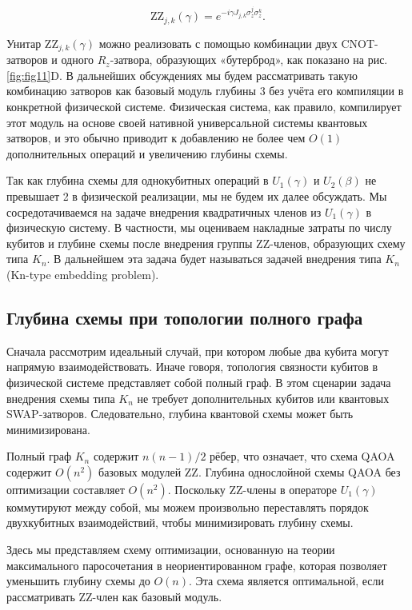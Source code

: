 \begin{equation}
\mathrm{ZZ}_{j,k}(\gamma) = e^{-i \gamma J_{j,k} \sigma_z^j \sigma_z^k}.
\end{equation}

Унитар $\text{ZZ}_{j,k}(\gamma)$ можно реализовать с помощью комбинации двух
CNOT-затворов и одного $R_z$-затвора, образующих «бутерброд», как показано на
рис. \ref{fig:fig11}D. В дальнейших обсуждениях мы будем рассматривать такую
комбинацию затворов как базовый модуль глубины 3 без учёта его компиляции в
конкретной физической системе. Физическая система, как правило, компилирует
этот модуль на основе своей нативной универсальной системы квантовых затворов,
и это обычно приводит к добавлению не более чем $O(1)$ дополнительных операций
и увеличению глубины схемы.

Так как глубина схемы для однокубитных операций в $U_1(\gamma)$ и $U_2(\beta)$
не превышает 2 в физической реализации, мы не будем их далее обсуждать. Мы
сосредотачиваемся на задаче внедрения квадратичных членов из $U_1(\gamma)$ в
физическую систему. В частности, мы оцениваем накладные затраты по числу
кубитов и глубине схемы после внедрения группы ZZ-членов, образующих схему типа
$K_n$. В дальнейшем эта задача будет называться задачей внедрения типа $K_n$
(Kn-type embedding problem).

\subsection*{Глубина схемы при топологии полного графа}

Сначала рассмотрим идеальный случай, при котором любые два кубита могут
напрямую взаимодействовать. Иначе говоря, топология связности кубитов в
физической системе представляет собой полный граф. В этом сценарии задача
внедрения схемы типа $K_n$ не требует дополнительных кубитов или квантовых
SWAP-затворов. Следовательно, глубина квантовой схемы может быть
минимизирована.

Полный граф $K_n$ содержит $n(n - 1)/2$ рёбер, что означает, что схема QAOA
содержит $O(n^2)$ базовых модулей ZZ. Глубина однослойной схемы QAOA без
оптимизации составляет $O(n^2)$. Поскольку ZZ-члены в операторе $U_1(\gamma)$
коммутируют между собой, мы можем произвольно переставлять порядок двухкубитных
взаимодействий, чтобы минимизировать глубину схемы.

Здесь мы представляем схему оптимизации, основанную на теории максимального
паросочетания в неориентированном графе, которая позволяет уменьшить глубину
схемы до $O(n)$. Эта схема является оптимальной, если рассматривать ZZ-член как
базовый модуль.

